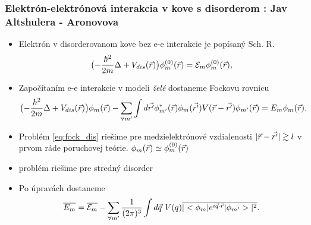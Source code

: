 \documentclass[
	11pt, %
]{beamer}
\begin{document}
\begin{frame}
\frametitle{Elektrón-elektrónová interakcia v kove s disorderom : Jav Altshulera - Aronovova}
\begin{itemize}
\item Elektrón v disorderovanom kove bez e-e interakcie je popísaný Sch. R.
\begin{equation}
\label{eq:schr_dis}
\bigl(-\frac{\hbar^2}{2m}\Delta + V_{dis}(\vec{r})\bigr)\phi_m^{(0)}(\vec{r})=\mathcal{E}_m\phi_m^{(0)}(\vec{r}) \text{,}
\end{equation}
\item Započítaním e-e interakcie v modeli \emph{želé} dostaneme Fockovu rovnicu
\small
\begin{equation}
 \label{eq:fock_dis}
 \bigl(-\frac{\hbar^2}{2m}\Delta + V_{dis}(\vec{r}) \bigr)\phi_m(\vec{r})-\sum_{\forall m'} \int d\vec{r'} \phi^*_{m'}(\vec{r})\phi_{m}(\vec{r'})V(\vec{r}-\vec{r'})\phi_{m'}(\vec{r})=E_m\phi_m(\vec{r}) \text{.}
\end{equation}
\normalsize
\item Problém \eqref{eq:fock_dis} riešime pre medzielektrónové vzdialenosti  $|\vec{r}-\vec{r'}| \gtrsim l$ v prvom ráde poruchovej teórie. $\phi_m(\vec{r}) \simeq \phi_m^{(0)}(\vec{r})$
\item problém riešime pre stredný disorder
\item Po úpravách dostaneme 
\begin{equation}
\label{eq:erg_meandis}
 \overline{E_m}=\overline{\mathcal{E}_m}-\sum_{\forall m'} \frac{1}{(2\pi)^{3}} \int d\vec{q}\ V(q) \overline{|<\phi_m|e^{i\vec{q}\cdot\vec{r}}|\phi_{m'}>|^2} \text{.}
\end{equation}
\end{itemize}
\end{frame}
\end{document}
